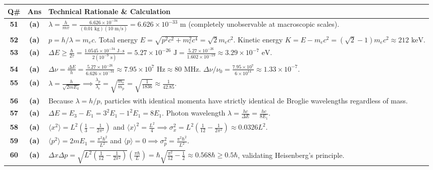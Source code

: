 {\small
\noindent\begin{tabularx}{\textwidth}{|c|c|X|}
\hline
\textbf{Q\#} & \textbf{Ans} & \textbf{Technical Rationale \& Calculation} \\
\hline
\textbf{51} & \textbf{(a)} & $\lambda = \frac{h}{m v} = \frac{6.626 \times 10^{-34}}{(0.01\text{ kg})(10\text{ m/s})} = 6.626 \times 10^{-33}\text{ m}$ (completely unobservable at macroscopic scales). \\ \hline
\textbf{52} & \textbf{(a)} & $p = h/\lambda = m_e c$. Total energy $E = \sqrt{p^2 c^2 + m_e^2 c^4} = \sqrt{2}m_e c^2$. Kinetic energy $K = E - m_e c^2 = (\sqrt{2}-1)m_e c^2 \approx 212\text{ keV}$. \\ \hline
\textbf{53} & \textbf{(a)} & $\Delta E \ge \frac{\hbar}{2\tau} = \frac{1.0545 \times 10^{-34}\text{ J}\cdot\text{s}}{2(10^{-9}\text{ s})} = 5.27 \times 10^{-26}\text{ J} = \frac{5.27 \times 10^{-26}}{1.602 \times 10^{-19}} \approx 3.29 \times 10^{-7}\text{ eV}$. \\ \hline
\textbf{54} & \textbf{(a)} & $\Delta\nu = \frac{\Delta E}{h} = \frac{5.27 \times 10^{-26}}{6.626 \times 10^{-34}} \approx 7.95 \times 10^7\text{ Hz} \approx 80\text{ MHz}$. $\Delta\nu/\nu_0 = \frac{7.95 \times 10^7}{6 \times 10^{14}} \approx 1.33 \times 10^{-7}$. \\ \hline
\textbf{55} & \textbf{(a)} & $\lambda = \frac{h}{\sqrt{2m E_k}} \implies \frac{\lambda_p}{\lambda_e} = \sqrt{\frac{m_e}{m_p}} = \sqrt{\frac{1}{1836}} \approx \frac{1}{42.85}$. \\ \hline
\textbf{56} & \textbf{(a)} & Because $\lambda = h/p$, particles with identical momenta have strictly identical de Broglie wavelengths regardless of mass. \\ \hline
\textbf{57} & \textbf{(a)} & $\Delta E = E_3 - E_1 = 3^2 E_1 - 1^2 E_1 = 8 E_1$. Photon wavelength $\lambda = \frac{hc}{\Delta E} = \frac{hc}{8 E_1}$. \\ \hline
\textbf{58} & \textbf{(a)} & $\langle x^2 \rangle = L^2(\frac{1}{3} - \frac{1}{2\pi^2})$ and $\langle x \rangle^2 = \frac{L^2}{4} \implies \sigma_x^2 = L^2(\frac{1}{12} - \frac{1}{2\pi^2}) \approx 0.0326 L^2$. \\ \hline
\textbf{59} & \textbf{(a)} & $\langle p^2 \rangle = 2m E_1 = \frac{\pi^2\hbar^2}{L^2}$ and $\langle p \rangle = 0 \implies \sigma_p^2 = \frac{\pi^2\hbar^2}{L^2}$. \\ \hline
\textbf{60} & \textbf{(a)} & $\Delta x \Delta p = \sqrt{L^2(\frac{1}{12}-\frac{1}{2\pi^2})}\left(\frac{\pi\hbar}{L}\right) = \hbar\sqrt{\frac{\pi^2}{12}-\frac{1}{2}} \approx 0.568\hbar \ge 0.5\hbar$, validating Heisenberg's principle. \\ \hline

\end{tabularx}}
